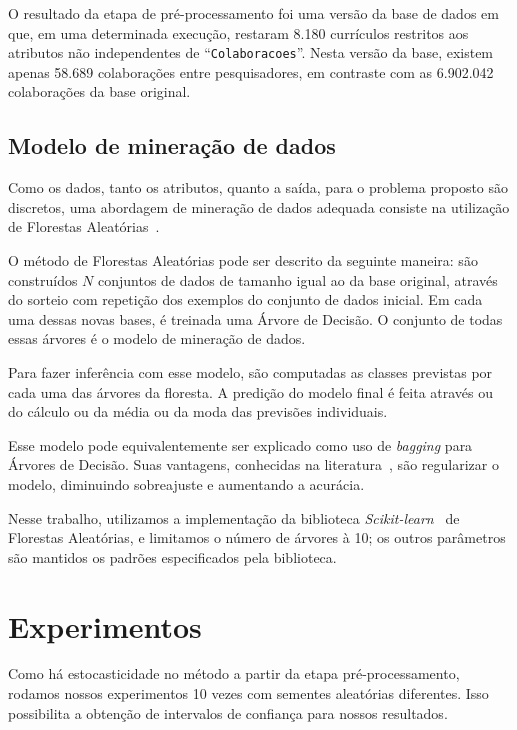 \documentclass[12pt]{article}
\begin{document}
O resultado da etapa de pré-processamento foi uma versão da base de dados em que, em uma determinada execução, restaram 8.180 currículos restritos aos atributos não independentes de ``\texttt{Colaboracoes}''.
Nesta versão da base, existem apenas 58.689 colaborações entre pesquisadores, em contraste com as 6.902.042 colaborações da base original.

\subsection{Modelo de mineração de dados}
\label{sec:datamining}

Como os dados, tanto os atributos, quanto a saída, para o problema proposto são discretos, uma abordagem de mineração de dados adequada consiste na utilização de Florestas Aleatórias~\cite{random-forests}.

O método de Florestas Aleatórias pode ser descrito da seguinte maneira: são construídos $N$ conjuntos de dados de tamanho igual ao da base original, através do sorteio com repetição dos exemplos do conjunto de dados inicial.
Em cada uma dessas novas bases, é treinada uma Árvore de Decisão.
O conjunto de todas essas árvores é o modelo de mineração de dados.

Para fazer inferência com esse modelo, são computadas as classes previstas por cada uma das árvores da floresta.
A predição do modelo final é feita através ou do cálculo ou da média ou da moda das previsões individuais.

Esse modelo pode equivalentemente ser explicado como uso de \emph{bagging} para Árvores de Decisão.
Suas vantagens, conhecidas na literatura~\cite{random-forests}, são regularizar o modelo, diminuindo sobreajuste e aumentando a acurácia.

Nesse trabalho, utilizamos a implementação da biblioteca \emph{Scikit-learn}~\cite{sklearn} de Florestas Aleatórias, e limitamos o número de árvores à 10; os outros parâmetros são mantidos os padrões especificados pela biblioteca.

\section{Experimentos}
\label{sec:experiments}

Como há estocasticidade no método a partir da etapa pré-processamento, rodamos nossos experimentos 10 vezes com sementes aleatórias diferentes.
Isso possibilita a obtenção de intervalos de confiança para nossos resultados.
\end{document}
